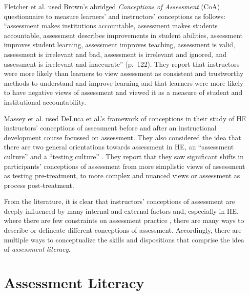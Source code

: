 \documentclass[
]{book}
\begin{document}
Fletcher et al. \citeyearpar{fletcherFacultyStudentsConceptions2012} used Brown's \citeyearpar{brownTeachersConceptionsAssessment2017} abridged \emph{Conceptions of Assessment} (CoA) questionnaire to measure learners' and instructors' conceptions as follows: ``assessment makes institutions accountable, assessment makes students accountable, assessment describes improvements in student abilities, assessment improves student learning, assessment improves teaching, assessment is valid, assessment is irrelevant and bad, assessment is irrelevant and ignored, and assessment is irrelevant and inaccurate'' (p.~122). They report that instructors were more likely than learners to view assessment as consistent and trustworthy methods to understand and improve learning and that learners were more likely to have negative views of assessment and viewed it as a measure of student and institutional accountability.

Massey et al. \citep{masseyAssessmentLiteracyCollege2020} used DeLuca et al.'s \citeyearpar{delucaEstablishingFoundationValid2013} framework of conceptions in their study of HE instructors' conceptions of assessment before and after an instructional development course focussed on assessment. They also considered the idea that there are two general orientations towards assessment in HE, an ``assessment culture'' and a ``testing culture'' \citep[as cited in \citet{masseyAssessmentLiteracyCollege2020}]{birenbaumAssessment2000Pluralistic1996, birenbaumNewInsightsLearning2003}. They report that they saw significant shifts in participants' conceptions of assessment from more simplistic views of assessment as testing pre-treatment, to more complex and nuanced views or assessment as process post-treatment.

From the literature, it is clear that instructors' conceptions of assessment are deeply influenced by many internal and external factors and, especially in HE, where there are few constraints on assessment practice \citep{lipnevichWhatGradesMean2020}, there are many ways to describe or delineate different conceptions of assessment. Accordingly, there are multiple ways to conceptualize the skills and dispositions that comprise the idea of \emph{assessment literacy}.

\hypertarget{assessment-literacy}{%
\section*{Assessment Literacy}\label{assessment-literacy}}
\end{document}
